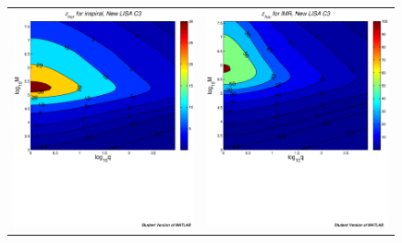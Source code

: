 \documentclass{iopart}
\begin{document}
\begin{figure}[H]
\begin{center}
\begin{tabular}{cc}
\includegraphics[scale=0.41,clip=true]{FigEmanuele/C3InspZhorContour.ps}
&\includegraphics[scale=0.41,clip=true]{FigEmanuele/C3IMRZhorContour.ps}\\

\end{tabular}
\end{center}
\end{figure}
\end{document}
